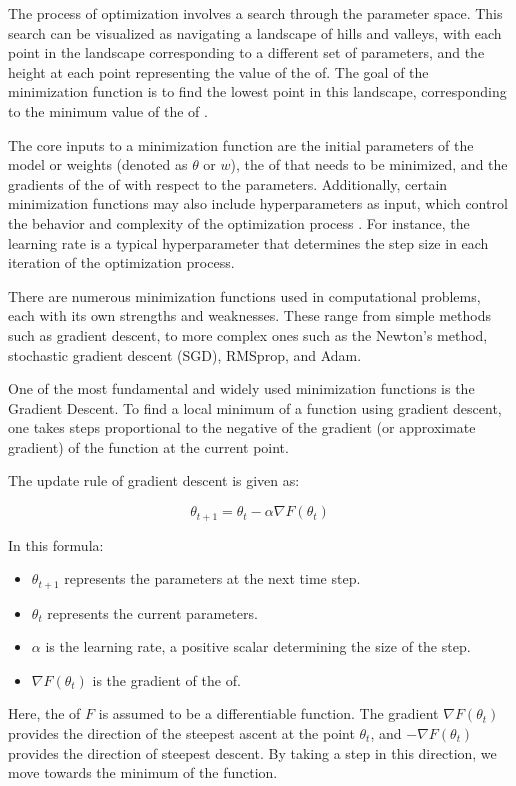 \documentclass[
  a4paper,  %
  twoside,  %
  bibliography=totoc,
  headsepline,
  cleardoublepage=empty,
  parskip=half,
  draft=false
]{scrbook}
\begin{document}
The process of optimization involves a search through the parameter space.
This search can be visualized as navigating a landscape of hills and valleys, with each point in the landscape corresponding to a different set of parameters, and the height at each point representing the value of the \gls{of}.
The goal of the minimization function is to find the lowest point in this landscape, corresponding to the minimum value of the \gls{of} \cite{Goodfellow2017}.

The core inputs to a minimization function are the initial parameters of the model or weights (denoted as \(\theta\) or \(w\)),
the \gls{of} that needs to be minimized, and the gradients of the \gls{of} with respect to the parameters.
Additionally, certain minimization functions may also include hyperparameters as input, which control the behavior and complexity of the optimization process \cite{Virtanen2020}.
For instance, the learning rate is a typical hyperparameter that determines the step size in each iteration of the optimization process.

There are numerous minimization functions used in computational problems, each with its own strengths and weaknesses.
These range from simple methods such as gradient descent, to more complex ones such as the Newton's method, stochastic gradient descent (SGD), RMSprop, and Adam.

One of the most fundamental and widely used minimization functions is the Gradient Descent.
To find a local minimum of a function using gradient descent, one takes steps proportional to the negative of the gradient (or approximate gradient) of the function at the current point.

The update rule of gradient descent is given as:

\[
\theta_{t+1} = \theta_t - \alpha \nabla F(\theta_t)
\]

In this formula:

\begin{itemize}
  \item \(\theta_{t+1}\) represents the parameters at the next time step.
  \item \(\theta_t\) represents the current parameters.
  \item \(\alpha\) is the learning rate, a positive scalar determining the size of the step.
  \item \(\nabla F(\theta_t)\) is the gradient of the of.
\end{itemize}

Here, the \gls{of} \(F\) is assumed to be a differentiable function.
The gradient \(\nabla F(\theta_t)\) provides the direction of the steepest ascent at the point \(\theta_t\), and \(-\nabla F(\theta_t)\) provides the direction of steepest descent.
By taking a step in this direction, we move towards the minimum of the function.
\end{document}
